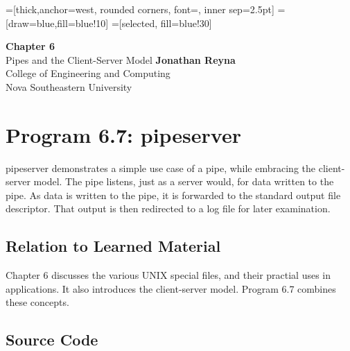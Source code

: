 \documentclass[letter,12pt,sffamily]{article}
\begin{document}
=[thick,anchor=west, rounded corners, font={\scriptsize\ttfamily}, inner sep=2.5pt]
=[draw=blue,fill=blue!10]
=[selected, fill=blue!30]

\begin{titlepage}
  \begin{center}
    \vspace*{1cm}
    \Huge
    \textbf{Chapter 6}\\
    \vspace{0.5cm}
    \LARGE
    Pipes and the Client-Server Model
    \vfill
    \Large
    \textbf{Jonathan Reyna}\\
    College of Engineering and Computing\\
    Nova Southeastern University\\
    \usdate{\today}
  \end{center}
\end{titlepage}

\section{Program 6.7: pipeserver}
pipeserver demonstrates a simple use case of a pipe, while embracing the client-server model. The pipe listens, just as a server would, for data written to the pipe. As data is written to the pipe, it is forwarded to the standard output file descriptor. That output is then redirected to a log file for later examination.
\subsection{Relation to Learned Material}
Chapter 6 discusses the various UNIX special files, and their practial uses in applications. It also introduces the client-server model. Program 6.7 combines these concepts. 
\subsection{Source Code}
\renewcommand{\theFancyVerbLine}{
\sffamily\textcolor[rgb]{0.5,0.5,0.5}{\scriptsize\arabic{FancyVerbLine}}}
\end{document}
